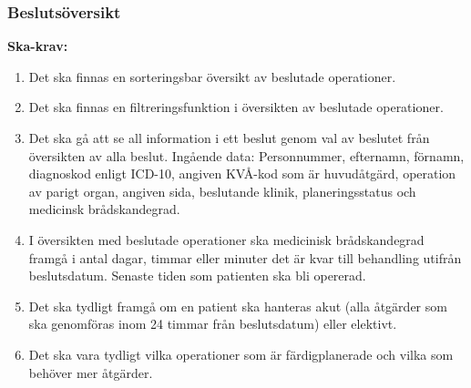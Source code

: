 \documentclass{article}
\begin{document}
\subsubsection{Beslutsöversikt}
\textbf{Ska-krav: }
\begin{enumerate}
  \item Det ska finnas en sorteringsbar översikt av beslutade operationer.
  \item Det ska finnas en filtreringsfunktion i översikten av beslutade
  operationer.
  \item Det ska gå att se all information i ett beslut genom val av
  beslutet från översikten av alla beslut.
  Ingående data:
  Personnummer, efternamn, förnamn, diagnoskod enligt ICD-10, angiven KVÅ-kod
  som är huvudåtgärd, operation av parigt organ, angiven sida, beslutande
  klinik, planeringsstatus och medicinsk brådskandegrad.
  \item I översikten med beslutade operationer ska medicinisk brådskandegrad
  framgå i antal dagar, timmar eller minuter det är kvar till behandling utifrån
  beslutsdatum. Senaste tiden som patienten ska bli opererad.
  \item Det ska tydligt framgå om en patient ska hanteras akut (alla åtgärder
  som ska genomföras inom 24 timmar från beslutsdatum) eller elektivt.
  \item Det ska vara tydligt vilka operationer som är färdigplanerade och vilka
  som behöver mer åtgärder.
\end{enumerate}
\end{document}
